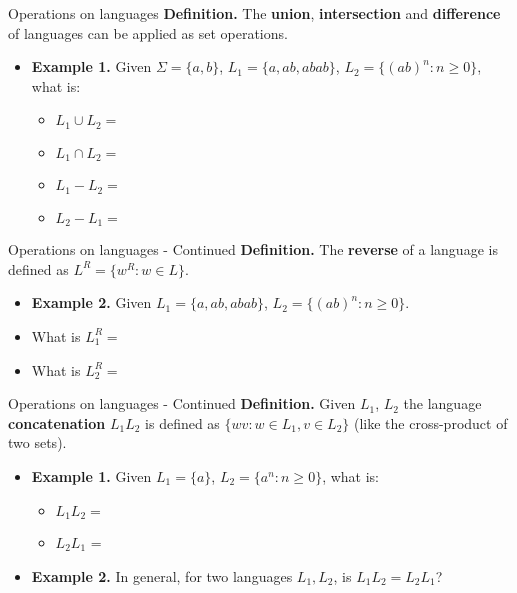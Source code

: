 \documentclass[10pt]{beamer}
\begin{document}
\begin{frame}{Operations on languages}
    \textbf{Definition.} The \textbf{union}, \textbf{intersection} and \textbf{difference} of languages can be applied as set operations.\\

    \begin{itemize}
        \item \textbf{Example 1.}         Given $\Sigma = \{a,b\}$, $L_1 = \{a, ab, abab\}$, $L_2 = \{(ab)^n: n \geq 0\}$, what is:
            \begin{itemize}[itemsep=5mm, parsep=0pt]
                \item $L_1 \cup L_2 = $
                \item $L_1 \cap L_2 = $
                \item $L_1 - L_2 = $
                \item $L_2 - L_1 = $
            \end{itemize}
            \vspace{5mm}
    \end{itemize}

\end{frame}

\begin{frame}{Operations on languages - Continued}
    \textbf{Definition.} The \textbf{reverse} of a language is defined as $L^R = \{w^R : w \in L\}$.
    \begin{itemize}[itemsep=5mm, parsep=0pt]
        \item \textbf{Example 2.} Given $L_1 = \{a, ab, abab\}$, $L_2 = \{(ab)^n: n \geq 0\}$.
        \item What is $L_1^R = $
        \item What is $L_2^R = $
    \end{itemize}
\end{frame}

\begin{frame}[t]{Operations on languages - Continued}
    \textbf{Definition.} Given $L_1$, $L_2$ the language \textbf{concatenation} $L_1L_2$ is defined as $\{wv : w \in L_1, v \in L_2\}$ (like the cross-product of two sets).
    \begin{itemize}
        \item \textbf{Example 1.} Given $L_1 = \{a\}$, $L_2 = \{a^n: n \geq 0\}$, what is:
            \begin{itemize}[itemsep=10mm, parsep=0pt]
                \item $L_1L_2 = $
                \item $L_2L_1$ =
            \end{itemize}
        \item \textbf{Example 2.} In general, for two languages $L_1, L_2$, is $L_1L_2 = L_2L_1$?
    \end{itemize}
\end{frame}
\end{document}
